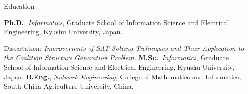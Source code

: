 \begin{rubric}{Education}

\entry*[2015.04 -- 2018.03]%
	\textbf{Ph.D.}, \emph{Informatics}, Graduate School of Information Science and Electrical Engineering, Kyushu University, Japan.
	\par Dissertation: \emph{Improvements of SAT Solving Techniques and Their Application to the Coalition Structure Generation Problem.}
	{\textcolor{MarkerColour!80!black}}
%
\entry*[2013.04 -- 2015.03]%
	\textbf{M.Sc.}, \emph{Informatics}, Graduate School of Information Science and Electrical Engineering, Kyushu University, Japan.
\entry*[2008.09 -- 2012.06]%
	\textbf{B.Eng.}, \emph{Network Engineering}, College of Mathematics and Informatics, South China Agriculture University, China.
\end{rubric}